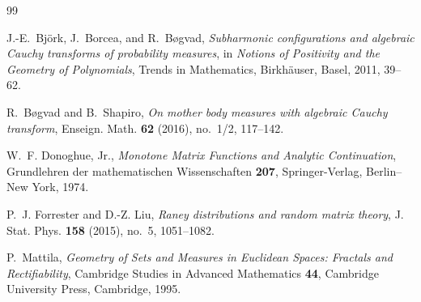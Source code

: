 \documentclass[reqno]{amsart}
\theoremstyle{definition}
\theoremstyle{remark}
\begin{document}
\begin{thebibliography}{99}

J.-E.~Bj\"ork, J.~Borcea, and R.~B\o gvad,
\emph{Subharmonic configurations and algebraic Cauchy transforms of probability
measures},
in \emph{Notions of Positivity and the Geometry of Polynomials},
Trends in Mathematics, Birkh\"auser, Basel, 2011, 39--62.

R.~B\o gvad and B.~Shapiro,
\emph{On mother body measures with algebraic Cauchy transform},
Enseign. Math. \textbf{62} (2016), no.~1/2, 117--142.

W.~F. Donoghue, Jr.,
\emph{Monotone Matrix Functions and Analytic Continuation},
Grundlehren der mathematischen Wissenschaften \textbf{207},
Springer-Verlag, Berlin--New York, 1974.

P.~J. Forrester and D.-Z. Liu,
\emph{Raney distributions and random matrix theory},
J. Stat. Phys. \textbf{158} (2015), no.~5, 1051--1082.

P.~Mattila,
\emph{Geometry of Sets and Measures in Euclidean Spaces: Fractals and
Rectifiability},
Cambridge Studies in Advanced Mathematics \textbf{44},
Cambridge University Press, Cambridge, 1995.

\end{thebibliography}
\end{document}
